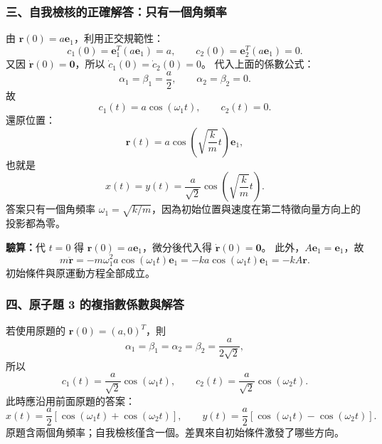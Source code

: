 \documentclass[12pt,a4paper]{article}
\begin{document}
\subsubsection*{三、自我檢核的正確解答：只有一個角頻率}
由 \(\mathbf r(0)=a\mathbf e_1\)，利用正交規範性：
\[
    c_1(0)=\mathbf e_1^T(a\mathbf e_1)=a,\qquad
    c_2(0)=\mathbf e_2^T(a\mathbf e_1)=0.
\]
又因 \(\dot{\mathbf r}(0)=\mathbf0\)，所以 \(\dot c_1(0)=\dot c_2(0)=0\)。
代入上面的係數公式：
\[
    \alpha_1=\beta_1=\frac a2,\qquad \alpha_2=\beta_2=0.
\]
故
\[
    \boxed{c_1(t)=a\cos(\omega_1t),\qquad c_2(t)=0}.
\]
還原位置：
\[
    \boxed{\mathbf r(t)=a\cos\left(\sqrt{\frac{k}{m}}t\right)\mathbf e_1},
\]
也就是
\[
    \boxed{x(t)=y(t)=\frac a{\sqrt2}
        \cos\left(\sqrt{\frac{k}{m}}t\right)}.
\]
答案只有一個角頻率 \(\omega_1=\sqrt{k/m}\)，因為初始位置與速度在第二特徵向量方向上的投影都為零。

\textbf{驗算：}代 \(t=0\) 得 \(\mathbf r(0)=a\mathbf e_1\)，微分後代入得 \(\dot{\mathbf r}(0)=\mathbf0\)。
此外，\(A\mathbf e_1=\mathbf e_1\)，故
\[
    m\ddot{\mathbf r}
    =-m\omega_1^2a\cos(\omega_1t)\mathbf e_1
    =-ka\cos(\omega_1t)\mathbf e_1
    =-kA\mathbf r.
\]
初始條件與原運動方程全部成立。

\subsubsection*{四、原子題 3 的複指數係數與解答}
若使用原題的 \(\mathbf r(0)=(a,0)^T\)，則
\[
    \alpha_1=\beta_1=\alpha_2=\beta_2=\frac{a}{2\sqrt2},
\]
所以
\[
    c_1(t)=\frac a{\sqrt2}\cos(\omega_1t),\qquad
    c_2(t)=\frac a{\sqrt2}\cos(\omega_2t).
\]
此時應沿用前面原題的答案：
\[
    x(t)=\frac a2[\cos(\omega_1t)+\cos(\omega_2t)],
    \qquad
    y(t)=\frac a2[\cos(\omega_1t)-\cos(\omega_2t)].
\]
原題含兩個角頻率；自我檢核僅含一個。差異來自初始條件激發了哪些方向。
\end{document}
